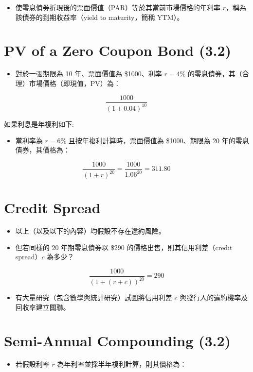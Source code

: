\documentclass[letterpaper]{article}
\begin{document}
\begin{itemize}
  \item 使零息債券折現後的票面價值（PAR）等於其當前市場價格的年利率 \( r \)，稱為該債券的到期收益率（yield to maturity，簡稱 YTM）。
\end{itemize}

\section*{PV of a Zero Coupon Bond (3.2)}
\begin{itemize}
	\item 對於一張期限為 10 年、票面價值為 \$1000、利率 \( r = 4\% \) 的零息債券，其（合理）市場價格（即現值，PV）為：
\end{itemize}


$$
\frac{1000}{(1+0.04)^{10}}
$$

如果利息是年複利如下:

\begin{itemize}
  \item 當利率為 \( r = 6\% \) 且按年複利計算時，票面價值為 \$1000、期限為 20 年的零息債券，其價格為：
  
\end{itemize}

$$
\frac{1000}{(1+r)^{20}}=\frac{1000}{1.06^{20}}=311.80
$$

\section*{Credit Spread}
\begin{itemize}
	\item 以上（以及以下的內容）均假設不存在違約風險。
	\item 但若同樣的 20 年期零息債券以 \$290 的價格出售，則其信用利差（credit spread）\( c \) 為多少？
\end{itemize}


$$
\frac{1000}{(1+(r+c))^{20}}=290
$$

\begin{itemize}
  \item 有大量研究（包含數學與統計研究）試圖將信用利差 \(c\) 與發行人的違約機率及回收率建立關聯。
\end{itemize}

\section*{Semi-Annual Compounding (3.2)}
\begin{itemize}
	\item 若假設利率 \( r \) 為年利率並採半年複利計算，則其價格為：
\end{itemize}
\end{document}
